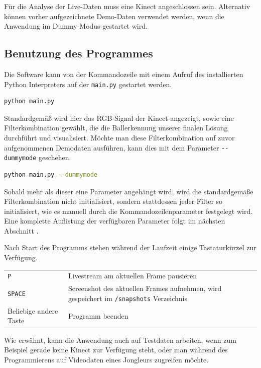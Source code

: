 \documentclass[12pt,a4paper,ngerman]{scrartcl}
\begin{document}
Für die Analyse der Live-Daten muss eine Kinect angeschlossen sein. Alternativ können vorher aufgezeichnete 
Demo-Daten verwendet werden, wenn die Anwendung im Dummy-Modus gestartet wird.


\subsection{Benutzung des Programmes}

Die Software kann von der Kommandozeile mit einem Aufruf des installierten Python Interpreters auf der \lstinline{main.py} gestartet werden. 

\begin{lstlisting}[language=bash]
python main.py
\end{lstlisting}

Standardgemäß wird hier das RGB-Signal der Kinect angezeigt, sowie eine Filterkombination gewählt, die 
die Ballerkennung unserer finalen Lösung durchführt und visualisiert. Möchte man diese Filterkombination
auf zuvor aufgenommenen Demodaten ausführen, kann dies mit dem Parameter \lstinline{--dummymode} geschehen.

\begin{lstlisting}[language=bash]
python main.py --dummymode
\end{lstlisting}

Sobald mehr als dieser eine Parameter angehängt wird, wird die standardgemäße Filterkombination
nicht initialisiert, sondern stattdessen jeder Filter so initialisiert, wie es manuell durch die 
Kommandozeilenparameter festgelegt wird. Eine komplette Auflistung der verfügbaren Parameter folgt im
nächsten Abschnitt \label{sec:parameter}.

Nach Start des Programms stehen während der Laufzeit einige Tastaturkürzel zur Verfügung.

\begin{tabular}{p{5cm}p{10cm}}
\hline
{\lstinline!P!} & Livestream am aktuellen Frame pausieren\\ 
{\lstinline!SPACE!} & Screenshot des aktuellen Frames aufnehmen, wird gespeichert im {\lstinline!/snapshots!} Verzeichnis\\
Beliebige andere Taste & Programm beenden\\ \hline
\end{tabular}

Wie erwähnt, kann die Anwendung auch auf Testdaten arbeiten, wenn zum Beispiel gerade keine Kinect zur 
Verfügung steht, oder man während des Programmierens auf Videodaten eines Jongleurs zugreifen möchte.
\end{document}
